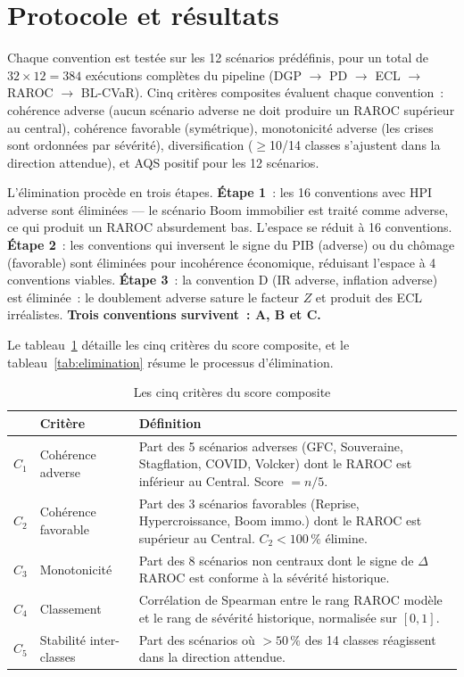 \documentclass[10pt, a4paper, oneside]{report}
\theoremstyle{definition}
\begin{document}
\section{Protocole et résultats}
\label{sec:ch5:protocole}

Chaque convention est testée sur les 12 scénarios prédéfinis, pour un total de $32 \times 12 = 384$ exécutions complètes du pipeline (DGP $\to$ PD $\to$ ECL $\to$ RAROC $\to$ BL-CVaR). Cinq critères composites évaluent chaque convention~: cohérence adverse (aucun scénario adverse ne doit produire un RAROC supérieur au central), cohérence favorable (symétrique), monotonicité adverse (les crises sont ordonnées par sévérité), diversification ($\geq$10/14 classes s'ajustent dans la direction attendue), et AQS positif pour les 12 scénarios.

L'élimination procède en trois étapes. \textbf{Étape 1}~: les 16 conventions avec HPI adverse sont éliminées --- le scénario Boom immobilier est traité comme adverse, ce qui produit un RAROC absurdement bas. L'espace se réduit à 16 conventions. \textbf{Étape 2}~: les conventions qui inversent le signe du PIB (adverse) ou du chômage (favorable) sont éliminées pour incohérence économique, réduisant l'espace à 4 conventions viables. \textbf{Étape 3}~: la convention D (IR adverse, inflation adverse) est éliminée~: le doublement adverse sature le facteur $Z$ et produit des ECL irréalistes. \textbf{Trois conventions survivent~: A, B et C.}

Le tableau~\ref{tab:criteres-composite} détaille les cinq critères du score composite, et le tableau~\ref{tab:elimination} résume le processus d'élimination.

\begin{table}[htbp]
\centering
\caption{Les cinq critères du score composite}
\label{tab:criteres-composite}
\small
\begin{tabular}{clp{7.5cm}}
\toprule
 & Critère & Définition \\
\midrule
$C_1$ & Cohérence adverse & Part des 5 scénarios adverses (GFC, Souveraine, Stagflation, COVID, Volcker) dont le RAROC est inférieur au Central. Score $= n/5$. \\
$C_2$ & Cohérence favorable & Part des 3 scénarios favorables (Reprise, Hypercroissance, Boom immo.) dont le RAROC est supérieur au Central. $C_2 < 100\,\%$ élimine. \\
$C_3$ & Monotonicité & Part des 8 scénarios non centraux dont le signe de $\Delta$RAROC est conforme à la sévérité historique. \\
$C_4$ & Classement & Corrélation de Spearman entre le rang RAROC modèle et le rang de sévérité historique, normalisée sur $[0, 1]$. \\
$C_5$ & Stabilité inter-classes & Part des scénarios où $> 50\,\%$ des 14 classes réagissent dans la direction attendue. \\
\bottomrule
\end{tabular}
\end{table}
\end{document}

